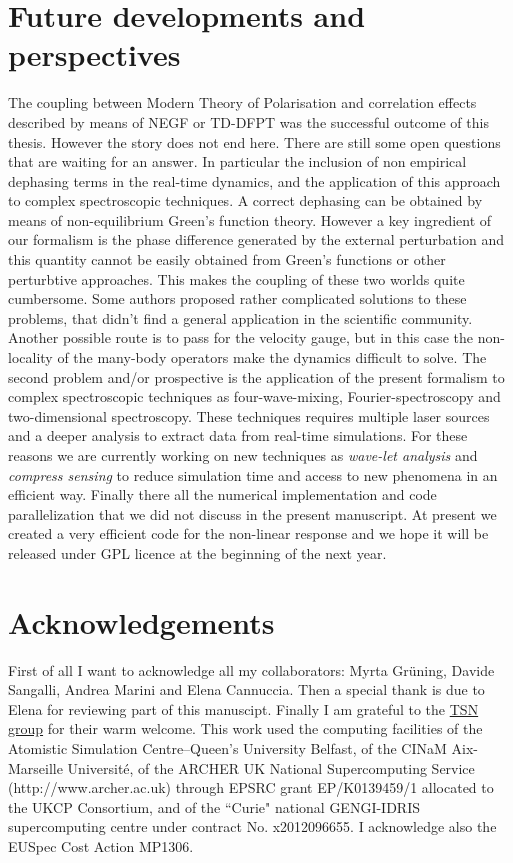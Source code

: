 \section*{Future developments and perspectives} 
The coupling between Modern Theory of Polarisation and correlation effects described by means of NEGF or TD-DFPT was the successful outcome of this thesis. However the story does not end here. There are still some open questions that are waiting for an answer. In particular the inclusion of non empirical dephasing terms in the real-time dynamics, and the application of this approach to complex spectroscopic techniques. A correct dephasing can be obtained by means of non-equilibrium Green's function theory. However a key ingredient of our formalism is the phase difference generated by the external perturbation and this quantity cannot be easily obtained from Green's functions or other perturbtive approaches. This makes the coupling of these two worlds quite cumbersome. Some authors proposed rather complicated solutions to these problems, that didn't find a general application in the scientific community. Another possible route is to pass for the velocity gauge, but in this case  the non-locality of the many-body operators make the dynamics difficult to solve.
The second problem and/or prospective is the application of the present formalism to complex spectroscopic techniques as four-wave-mixing, Fourier-spectroscopy and two-dimensional spectroscopy. These techniques requires multiple laser sources and  a deeper analysis to extract data from real-time simulations. For these reasons we are currently working on new techniques as {\it wave-let analysis} and {\it compress sensing} to reduce simulation time and access to new phenomena in an efficient way.
Finally there all the numerical implementation and code parallelization that we did not discuss in the present manuscript. At present we created a very efficient code for the non-linear response and we hope it will be released under GPL licence at the beginning of the next year.

\section*{Acknowledgements}
\label{ackno}                                        
First of all I want to acknowledge all my collaborators: Myrta Gr\"uning,  Davide Sangalli, Andrea Marini and Elena Cannuccia. Then a special thank is due to Elena for reviewing part of this manuscipt. Finally I am grateful to the \href{http://www.cinam.univ-mrs.fr/cinam/spip.php?rubrique36}{TSN group} for their warm welcome. 
This work used the computing facilities of the Atomistic Simulation Centre--Queen's University Belfast, of the CINaM Aix-Marseille Universit\'e, of the ARCHER UK National Supercomputing Service (http://www.archer.ac.uk)  through EPSRC grant EP/K0139459/1 allocated to the UKCP Consortium, and of the ``Curie" national GENGI-IDRIS supercomputing centre under contract No. x2012096655. I acknowledge also the EUSpec Cost Action MP1306. 

